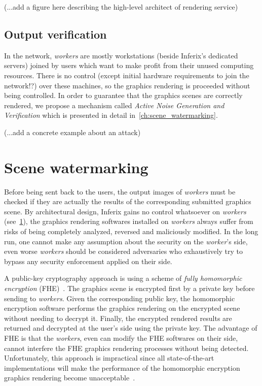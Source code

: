 \documentclass[a4paper,11pt,onecolumn]{memoir}
\begin{document}
(...add a figure here describing the high-level architect of rendering service)

\section[Output verification]{Output verification}\label{sec:output_verification}
In the network, \emph{workers} are mostly workstations (beside Inferix's dedicated servers) joined by users which want to make profit from their unused computing resources. There is no control (except initial hardware requirements to join the network!?) over these machines, so the graphics rendering is proceeded without being controlled. In order to guarantee that the graphics scenes are correctly rendered, we propose a mechanism called \emph{Active Noise Generation and Verification} which is presented in detail in~\autoref{ch:scene_watermarking}.

(...add a concrete example about an attack)

\chapter{Scene watermarking}\label{ch:scene_watermarking}
Before being sent back to the users, the output images of \emph{workers} must be checked if they are actually the results of the corresponding submitted graphics scene. By architectural design, Inferix gains no control whatsoever on \emph{workers} (see~\ref{sec:output_verification}), the graphics rendering softwares installed on \emph{workers} always suffer from risks of being completely analyzed, reversed and maliciously modified. In the long run, one cannot make any assumption about the security on the \emph{worker}'s side, even worse \emph{workers} should be considered adversaries who exhaustively try to bypass any security enforcement applied on their side.

A public-key cryptography approach is using a scheme of \emph{fully homomorphic encryption} (FHE)~\cite{Gentry2009}. The graphics scene is encrypted first by a private key before sending to \emph{workers}. Given the corresponding public key, the homomorphic encryption software performs the graphics rendering on the encrypted scene without needing to decrypt it. Finally, the encrypted rendered results are returned and decrypted at the user's side using the private key. The advantage of FHE is that the \emph{workers}, even can modify the FHE softwares on their side, cannot interfere the FHE graphics rendering processes without being detected. Unfortunately, this approach is impractical since all state-of-the-art implementations will make the performance of the homomorphic encryption graphics rendering become unacceptable~\cite{9910347}.
\end{document}
